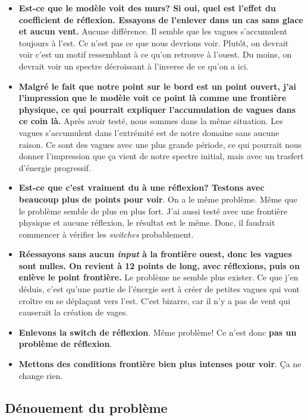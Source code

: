 \documentclass[10pt]{article}
\numberwithin{equation}{section}
\begin{document}
\begin{itemize}
\item \textbf{Est-ce que le modèle voit des murs? Si oui, quel est l'effet du coefficient de réflexion. Essayons de l'enlever dans un cas sans glace et aucun vent.} Aucune différence. Il semble que les vagues s'accumulent toujours à l'est. Ce n'est pas ce que nous devrions voir. Plutôt, on devrait voir c'est un motif ressemblant à ce qu'on retrouve à l'ouest. Du moins, on devrait voir un spectre décroissant à l'inverse de ce qu'on a ici.

\item \textbf{Malgré le fait que notre point sur le bord est un point ouvert, j'ai l'impression que le modèle voit ce point là comme une frontière physique, ce qui pourrait expliquer l'accumulation de vagues dans ce coin là.} Après avoir testé, nous sommes dans la même situation. Les vagues s'accumulent dans l'extrémité est de notre domaine sans aucune raison. Ce sont des vagues avec une plus grande période, ce qui pourrait nous donner l'impression que ça vient de notre spectre initial, mais avec un trasfert d'énergie progressif.

\item \textbf{Est-ce que c'est vraiment du à une réflexion? Testons avec beaucoup plus de points pour voir}. On a le même problème. Même que le problème semble de plus en plus fort. J'ai aussi testé avec une frontière physique et aucune réflexion, le résultat est le même. Donc, il faudrait commencer à vérifier les \emph{switches} probablement.

\item \textbf{Réessayons sans aucun \emph{input} à la frontière ouest, donc les vagues sont nulles. On revient à 12 points de long, avec réflexions, puis on enlève le point frontière.} Le problème ne semble plus exister. Ce que j'en déduis, c'est qu'une partie de l'énergie sert à créer de petites vagues qui vont croître en se déplaçant vers l'est. C'est bizarre, car il n'y a pas de vent qui causerait la création de vages.

\item \textbf{Enlevons la switch de réflexion}. Même problème! Ce n'est donc \textbf{pas un problème de réflexion}.

\item \textbf{Mettons des conditions frontière bien plus intenses pour voir}. Ça ne change rien.
\end{itemize}
\subsection{Dénouement du problème}
\label{sec:orgb6ec42f}
\end{document}
